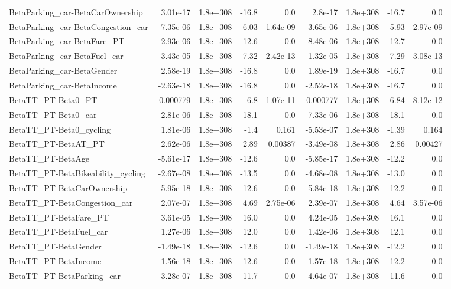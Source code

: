\begin{tabular}{lrrrrrrrr}
BetaParking_car-BetaCarOwnership & 3.01e-17 & 1.8e+308 & -16.8 & 0.0 & 2.8e-17 & 1.8e+308 & -16.7 & 0.0 \\
BetaParking_car-BetaCongestion_car & 7.35e-06 & 1.8e+308 & -6.03 & 1.64e-09 & 3.65e-06 & 1.8e+308 & -5.93 & 2.97e-09 \\
BetaParking_car-BetaFare_PT & 2.93e-06 & 1.8e+308 & 12.6 & 0.0 & 8.48e-06 & 1.8e+308 & 12.7 & 0.0 \\
BetaParking_car-BetaFuel_car & 3.43e-05 & 1.8e+308 & 7.32 & 2.42e-13 & 1.32e-05 & 1.8e+308 & 7.29 & 3.08e-13 \\
BetaParking_car-BetaGender & 2.58e-19 & 1.8e+308 & -16.8 & 0.0 & 1.89e-19 & 1.8e+308 & -16.7 & 0.0 \\
BetaParking_car-BetaIncome & -2.63e-18 & 1.8e+308 & -16.8 & 0.0 & -2.52e-18 & 1.8e+308 & -16.7 & 0.0 \\
BetaTT_PT-Beta0_PT & -0.000779 & 1.8e+308 & -6.8 & 1.07e-11 & -0.000777 & 1.8e+308 & -6.84 & 8.12e-12 \\
BetaTT_PT-Beta0_car & -2.81e-06 & 1.8e+308 & -18.1 & 0.0 & -7.33e-06 & 1.8e+308 & -18.1 & 0.0 \\
BetaTT_PT-Beta0_cycling & 1.81e-06 & 1.8e+308 & -1.4 & 0.161 & -5.53e-07 & 1.8e+308 & -1.39 & 0.164 \\
BetaTT_PT-BetaAT_PT & 2.62e-06 & 1.8e+308 & 2.89 & 0.00387 & -3.49e-08 & 1.8e+308 & 2.86 & 0.00427 \\
BetaTT_PT-BetaAge & -5.61e-17 & 1.8e+308 & -12.6 & 0.0 & -5.85e-17 & 1.8e+308 & -12.2 & 0.0 \\
BetaTT_PT-BetaBikeability_cycling & -2.67e-08 & 1.8e+308 & -13.5 & 0.0 & -4.68e-08 & 1.8e+308 & -13.0 & 0.0 \\
BetaTT_PT-BetaCarOwnership & -5.95e-18 & 1.8e+308 & -12.6 & 0.0 & -5.84e-18 & 1.8e+308 & -12.2 & 0.0 \\
BetaTT_PT-BetaCongestion_car & 2.07e-07 & 1.8e+308 & 4.69 & 2.75e-06 & 2.39e-07 & 1.8e+308 & 4.64 & 3.57e-06 \\
BetaTT_PT-BetaFare_PT & 3.61e-05 & 1.8e+308 & 16.0 & 0.0 & 4.24e-05 & 1.8e+308 & 16.1 & 0.0 \\
BetaTT_PT-BetaFuel_car & 1.27e-06 & 1.8e+308 & 12.0 & 0.0 & 1.42e-06 & 1.8e+308 & 12.1 & 0.0 \\
BetaTT_PT-BetaGender & -1.49e-18 & 1.8e+308 & -12.6 & 0.0 & -1.49e-18 & 1.8e+308 & -12.2 & 0.0 \\
BetaTT_PT-BetaIncome & -1.56e-18 & 1.8e+308 & -12.6 & 0.0 & -1.57e-18 & 1.8e+308 & -12.2 & 0.0 \\
BetaTT_PT-BetaParking_car & 3.28e-07 & 1.8e+308 & 11.7 & 0.0 & 4.64e-07 & 1.8e+308 & 11.6 & 0.0 \\

\end{tabular}
